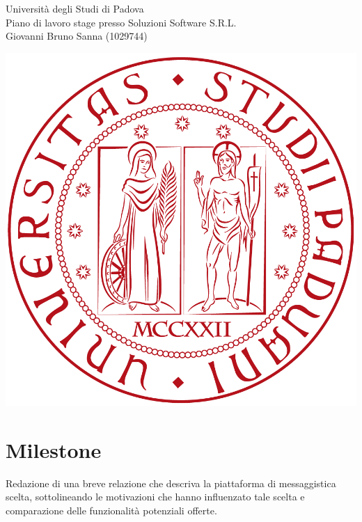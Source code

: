 \documentclass[11pt,notitlepage]{article}
\newcommand{\nomeStudente}{Giovanni Bruno}
\newcommand{\cognomeStudente}{Sanna}
\newcommand{\matricolaStudente}{1029744}
\newcommand{\ragioneSocAzienda}{Soluzioni Software S.R.L.}
\begin{document}
\noindent
\parbox{0.7\columnwidth}{Università degli Studi di Padova\\
	Piano di lavoro stage presso \ragioneSocAzienda{}\\
	\nomeStudente{} \cognomeStudente{} (\matricolaStudente{})}%
\parbox{0.3\columnwidth}{
	\hfill \includegraphics[scale=0.08]{immagini/logo-unipd.png}}

\bigskip
\section*{Milestone}
Redazione di una breve relazione che descriva la piattaforma di messaggistica
scelta, sottolineando le motivazioni che hanno influenzato tale scelta e comparazione delle funzionalità potenziali offerte.

\bigskip
\end{document}
